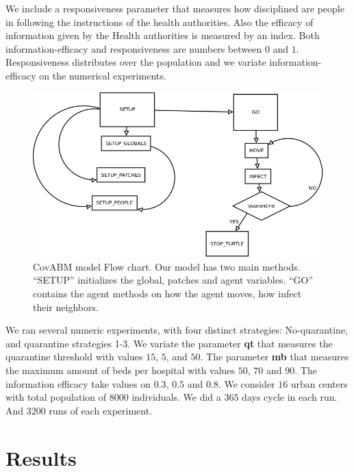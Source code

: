 \documentclass[11pt,a4paper,reqno]{amsart}
\theoremstyle{definition}
\theoremstyle{remark}
\begin{document}
We include a responsiveness  parameter that measures how disciplined are people in following the instructions of the health authorities. Also the efficacy of information given by the Health authorities is measured by an index. Both information-efficacy and responsiveness are numbers between $0$ and $1$. Responsiveness distributes over the population and we variate information-efficacy on the numerical experiments. 



\begin{figure}[H]
\centering
\includegraphics[width=\textwidth]{COVIDv1_2.png}
\caption{CovABM model Flow chart. Our model has two main methods. ``SETUP'' initializes the global, patches and agent variables. ``GO'' contains the agent methods on how the agent moves, how infect their neighbors.}
\end{figure}


We ran several numeric experiments, with four distinct strategies: No-quarantine, and quarantine strategies 1-3. We variate  the parameter {\bf qt} that measures the quarantine threshold with values $15$, $5$, and $50$. The parameter {\bf mb} that measures the maximum amount of beds per hospital with values $50$, $70$ and $90$. The information efficacy take values on $0.3$, $0.5$ and $0.8$. We consider $16$ urban centers  with total population of $8000$ individuals. We did a $365$ days cycle in each run. And $3200$ runs of each experiment. 

\bigskip


\bigskip
\newpage
\section{Results}
\end{document}
